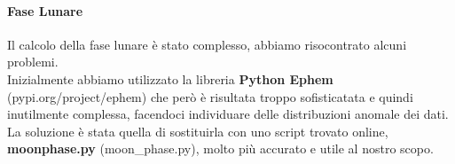 \documentclass[12pt,a4paper,twoside]{article}
\begin{document}
\paragraph{Fase Lunare}
Il calcolo della fase lunare è stato complesso, abbiamo risocontrato alcuni problemi.\\
Inizialmente abbiamo utilizzato la libreria \textbf{Python Ephem} (pypi.org/project/ephem) che però è 
risultata troppo sofisticatata e quindi inutilmente complessa, facendoci individuare delle distribuzioni 
anomale dei dati. La soluzione è stata quella di sostituirla con uno script trovato online, 
\textbf{moonphase.py} (moon\_phase.py), molto più accurato e utile al nostro scopo.

\\
\end{document}
